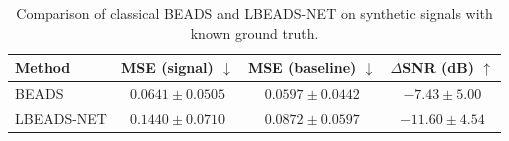 
\begin{table}[htbp]
\centering
\caption{Comparison of classical BEADS and LBEADS-NET on synthetic signals with known ground truth.}
\label{tab:comparison}
\begin{tabular}{lccc}
\toprule
\textbf{Method} & \textbf{MSE (signal) $\downarrow$} & \textbf{MSE (baseline) $\downarrow$} & \textbf{$\Delta$SNR (dB) $\uparrow$} \\
\midrule
BEADS & $0.0641 \pm 0.0505$ & $0.0597 \pm 0.0442$ & $-7.43 \pm 5.00$ \\
LBEADS-NET & $0.1440 \pm 0.0710$ & $0.0872 \pm 0.0597$ & $-11.60 \pm 4.54$ \\

\bottomrule
\end{tabular}
\end{table}
